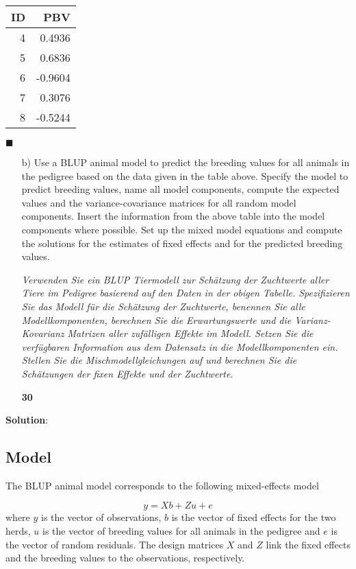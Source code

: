 \documentclass[
]{article}
\newcommand{\points}[1]
{\begin{flushright}\textbf{#1}\end{flushright}}
\newcommand{\solstart}
{\vspace{3ex}\textbf{Solution}:}
\newcommand{\solend}
{\vspace{2ex}$\blacksquare$}
\begin{document}
\begin{tabular}{rr}
\toprule
ID & PBV\\
\midrule
4 & 0.4936\\
5 & 0.6836\\
6 & -0.9604\\
7 & 0.3076\\
8 & -0.5244\\
\bottomrule
\end{tabular}

\solend

\clearpage
\pagebreak

\begin{enumerate}
\item[b)] Use a BLUP animal model to predict the breeding values for all animals in the pedigree based on the data given in the table above. Specify the model to predict breeding values, name all model components, compute the expected values and the variance-covariance matrices for all random model components. Insert the information from the above table into the model components where possible. Set up the mixed model equations and compute the solutions for the estimates of fixed effects and for the predicted breeding values. 

\textit{Verwenden Sie ein BLUP Tiermodell zur Schätzung der Zuchtwerte aller Tiere im Pedigree basierend auf den Daten in der obigen Tabelle. Spezifizieren Sie das Modell für die Schätzung der Zuchtwerte, benennen Sie alle Modellkomponenten, berechnen Sie die Erwartungswerte und die Varianz-Kovarianz Matrizen aller zufälligen Effekte im Modell. Setzen Sie die verfügbaren Information aus dem Datensatz in die Modellkomponenten ein. Stellen Sie die Mischmodellgleichungen auf und berechnen Sie die Schätzungen der fixen Effekte und der Zuchtwerte.}
\points{30}
\end{enumerate}

\solstart

\hypertarget{model}{%
\subsection{Model}\label{model}}

The BLUP animal model corresponds to the following mixed-effects model

\[y = Xb + Zu + e\] where \(y\) is the vector of observations, \(b\) is
the vector of fixed effects for the two herds, \(u\) is the vector of
breeding values for all animals in the pedigree and \(e\) is the vector
of random residuals. The design matrices \(X\) and \(Z\) link the fixed
effects and the breeding values to the observations, respectively.
\end{document}

